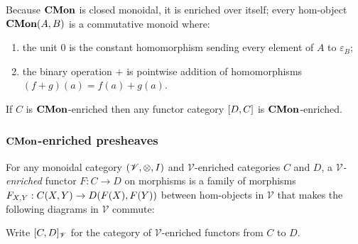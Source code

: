 Because $\mathbf{CMon}$ is closed monoidal, it is enriched over itself; every hom-object ${\mathbf{CMon}}(A,B)$ is a
commutative monoid where:

\begin{enumerate}
\item the unit $0$ is the constant homomorphism sending every element of $A$ to $\varepsilon_B$;
\item the binary operation $+$ is pointwise addition of homomorphisms $(f + g)(a) = f(a) + g(a)$.
\end{enumerate}

\begin{proposition}
If $C$ is $\mathbf{CMon}$-enriched then any functor category $[D,C]$ is $\mathbf{CMon}$-enriched.
\end{proposition}

\subsubsection{$\mathbf{CMon}$-enriched presheaves}

\begin{definition}
For any monoidal category $(\mathscr{V}, \otimes, I)$ and $\mathscr{V}$-enriched categories $C$ and $D$, a
\emph{$\mathscr{V}$-enriched} functor $F: C \to D$ on morphisms is a family of morphisms $F_{X,Y}:
{C}(X,Y) \to {D}(F(X),F(Y))$ between hom-objects in $\mathscr{V}$ that makes the following diagrams
in $\mathscr{V}$ commute:

\begin{center}
\hspace{5mm}
\end{center}
\end{definition}

Write $[C,D]_{\mathscr{V}}$ for the category of $\mathscr{V}$-enriched functors from $C$ to $D$.

